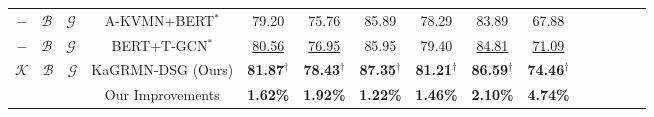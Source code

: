 \begin{table*}[ht]
{\begin{tabular}{ccccccccccccc}
 $\mathcal{-} \quad \mathcal{B} \quad \mathcal{G}$ & A-KVMN+BERT$^*$ \cite{kvmn-eacl}   & 79.20    &75.76   &85.89      & 78.29   & 83.89  &67.88    \\
 $\mathcal{-} \quad \mathcal{B} \quad \mathcal{G}$ & BERT+T-GCN$^*$ \cite{tgcn}    & \underline{80.56}    &\underline{76.95}    &85.95      & 79.40   & \underline{84.81} & \underline{71.09} \\\hline
$\mathcal{K} \quad \mathcal{B} \quad \mathcal{G}$ & KaGRMN-DSG (Ours)    &\textbf{81.87$^\dag$}    & \textbf{78.43$^\dag$}     &\textbf{87.35$^\dag$}   & \textbf{81.21$^\dag$}      &\textbf{86.59$^\dag$}   &\textbf{74.46$^\dag$}        \\
   & Our Improvements      & \textbf{1.62\%}  &\textbf{1.92\%} & \textbf{1.22\%} &\textbf{1.46\%} &\textbf{2.10\%} &\textbf{4.74\%} \\
\bottomrule
\end{tabular}}
\label{table: avg results}
\end{table*}


